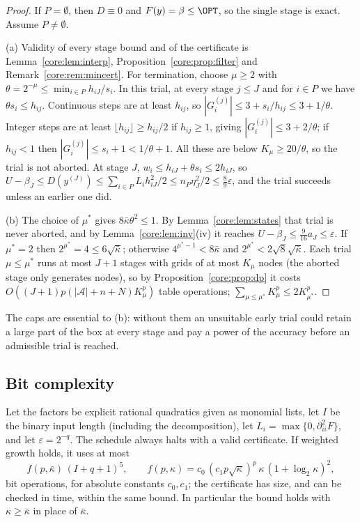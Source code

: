 \begin{proof}
If $P=\emptyset$, then $D\equiv0$ and $F(y)=\beta\le\OPT$, so the single stage
is exact. Assume $P\ne\emptyset$.

(a) Validity of every stage bound and of the certificate is
Lemma~\ref{core:lem:interp}, Proposition~\ref{core:prop:filter} and
Remark~\ref{core:rem:mincert}. For termination, choose $\mu\ge2$ with
$\theta=2^{-\mu}\le\min_{i\in P}h_{iJ}/s_i$. In this trial, at every stage
$j\le J$ and for $i\in P$ we have $\theta s_i\le h_{ij}$. Continuous steps are
at least $h_{ij}$, so $|G_i^{(j)}|\le3+s_i/h_{ij}\le3+1/\theta$. Integer steps
are at least $\lfloor h_{ij}\rfloor\ge h_{ij}/2$ if $h_{ij}\ge1$, giving
$|G_i^{(j)}|\le3+2/\theta$; if $h_{ij}<1$ then
$|G_i^{(j)}|\le s_i+1<1/\theta+1$. All these are below $K_\mu\ge20/\theta$, so
the trial is not aborted. At stage $J$, $w_i\le h_{iJ}+\theta s_i\le2h_{iJ}$,
so $U-\beta_J\le D(y^{(J)})\le\sum_{i\in P}L_ih_{iJ}^2/2\le n_P\eta_J^2/2
\le\frac89\varepsilon$, and the trial succeeds unless an earlier one did.

(b) The choice of $\mu^*$ gives $8\bar\kappa\theta^2\le1$. By
Lemma~\ref{core:lem:states} that trial is never aborted, and by
Lemma~\ref{core:lem:inv}(iv) it reaches $U-\beta_J\le\frac9{16}a_J\le\varepsilon$.
If $\mu^*=2$ then $2^{\mu^*}=4\le6\sqrt{\bar\kappa}$; otherwise
$4^{\mu^*-1}<8\bar\kappa$ and $2^{\mu^*}<2\sqrt8\sqrt{\bar\kappa}$. Each trial
$\mu\le\mu^*$ runs at most $J+1$ stages with grids of at most $K_\mu$ nodes
(the aborted stage only generates nodes), so by
Proposition~\ref{core:prop:dp} it costs $O((J+1)p(|\mathcal A|+n+N)K_\mu^p)$
table operations; $\sum_{\mu\le\mu^*}K_\mu^p\le2K_{\mu^*}^p$.
\end{proof}

The caps are essential to (b): without them an unsuitable early trial could
retain a large part of the box at every stage and pay a power of the accuracy
before an admissible trial is reached.

\subsection{Bit complexity}\label{core:sec:bits}

\begin{theorem}\label{core:thm:bits}
Let the factors be explicit rational quadratics given as monomial lists, let
$I$ be the binary input length (including the decomposition), let
$L_i=\max\{0,\partial_{ii}^2F\}$, and let $\varepsilon=2^{-q}$. The schedule
always halts with a valid certificate. If weighted growth holds, it uses at
most
\[
f(p,\bar\kappa)\,(I+q+1)^5,\qquad
f(p,\kappa)=c_0\,(c_1p\sqrt\kappa)^p\,\kappa\,(1+\log_2\kappa)^2,
\]
bit operations, for absolute constants $c_0,c_1$; the certificate has size,
and can be checked in time, within the same bound. In particular the bound
holds with $\kappa\ge\bar\kappa$ in place of $\bar\kappa$.
\end{theorem}

